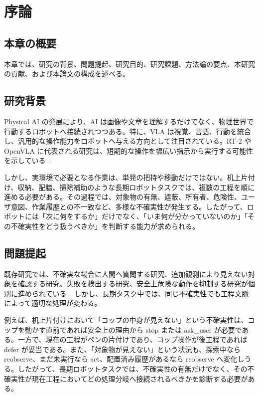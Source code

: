 \chapter{序論}

\section{本章の概要}

本章では、研究の背景、問題提起、研究目的、研究課題、方法論の要点、本研究の貢献、および本論文の構成を述べる。

\section{研究背景}

Physical AI の発展により、AI は画像や文章を理解するだけでなく、物理世界で行動するロボットへ接続されつつある。特に、VLA は視覚、言語、行動を統合し、汎用的な操作能力をロボットへ与える方向として注目されている。RT-2 や OpenVLA に代表される研究は、短期的な操作を幅広い指示から実行する可能性を示している~\cite{rt2, openvla, rt1}.

しかし、実環境で必要となる作業は、単発の把持や移動だけではない。机上片付け、収納、配膳、掃除補助のような長期ロボットタスクでは、複数の工程を順に進める必要がある。その過程では、対象物の有無、遮蔽、所有者、危険性、ユーザ意図、作業履歴との不一致など、多様な不確実性が発生する。したがって、ロボットには「次に何をするか」だけでなく、「いま何が分かっていないのか」「その不確実性をどう扱うべきか」を判断する能力が求められる。

\section{問題提起}

既存研究では、不確実な場合に人間へ質問する研究、追加観測により見えない対象を確認する研究、失敗を検出する研究、安全上危険な動作を抑制する研究が個別に進められている~\cite{knowno, apvlm, aha}. しかし、長期タスク中では、同じ不確実性でも工程文脈によって適切な処理が変わる。

例えば、机上片付けにおいて「コップの中身が見えない」という不確実性は、コップを動かす直前であれば安全上の理由から stop または ask\_user が必要である。一方で、現在の工程がペンの片付けであり、コップ操作が後工程であれば defer が妥当である。また、「対象物が見えない」という状況も、探索中なら reobserve、まだ未実行なら act、配置済み履歴があるなら reobserve へ変化しうる。したがって、長期ロボットタスクでは、不確実性の有無だけでなく、その不確実性が現在工程においてどの処理分岐へ接続されるべきかを診断する必要がある。

